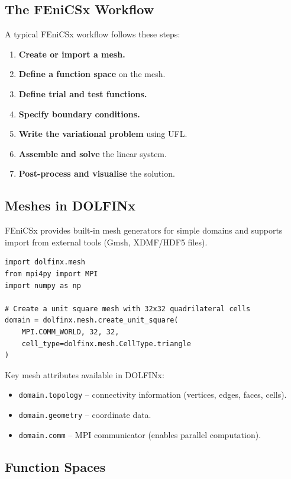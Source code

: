 \documentclass[11pt]{article}
\begin{document}
\subsection{The FEniCSx Workflow}

A typical FEniCSx workflow follows these steps:

\begin{enumerate}
  \item \textbf{Create or import a mesh.}
  \item \textbf{Define a function space} on the mesh.
  \item \textbf{Define trial and test functions.}
  \item \textbf{Specify boundary conditions.}
  \item \textbf{Write the variational problem} using UFL.
  \item \textbf{Assemble and solve} the linear system.
  \item \textbf{Post-process and visualise} the solution.
\end{enumerate}

\subsection{Meshes in DOLFINx}

FEniCSx provides built-in mesh generators for simple domains and supports
import from external tools (Gmsh, XDMF/HDF5 files).

\begin{lstlisting}[style=python, caption={Creating a unit-square mesh in FEniCSx.}]
import dolfinx.mesh
from mpi4py import MPI
import numpy as np

# Create a unit square mesh with 32x32 quadrilateral cells
domain = dolfinx.mesh.create_unit_square(
    MPI.COMM_WORLD, 32, 32,
    cell_type=dolfinx.mesh.CellType.triangle
)
\end{lstlisting}

Key mesh attributes available in DOLFINx:
\begin{itemize}
  \item \texttt{domain.topology} -- connectivity information (vertices, edges, faces, cells).
  \item \texttt{domain.geometry} -- coordinate data.
  \item \texttt{domain.comm} -- MPI communicator (enables parallel computation).
\end{itemize}

\subsection{Function Spaces}
\end{document}
